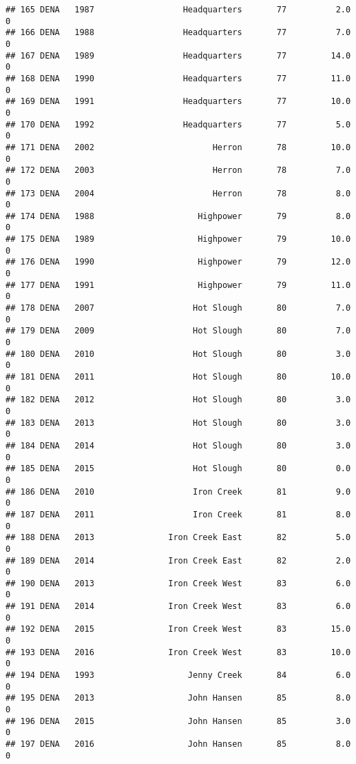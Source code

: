 \documentclass[
]{article}
\begin{document}
\begin{verbatim}
## 165 DENA   1987                  Headquarters       77          2.0       0
## 166 DENA   1988                  Headquarters       77          7.0       0
## 167 DENA   1989                  Headquarters       77         14.0       0
## 168 DENA   1990                  Headquarters       77         11.0       0
## 169 DENA   1991                  Headquarters       77         10.0       0
## 170 DENA   1992                  Headquarters       77          5.0       0
## 171 DENA   2002                        Herron       78         10.0       0
## 172 DENA   2003                        Herron       78          7.0       0
## 173 DENA   2004                        Herron       78          8.0       0
## 174 DENA   1988                     Highpower       79          8.0       0
## 175 DENA   1989                     Highpower       79         10.0       0
## 176 DENA   1990                     Highpower       79         12.0       0
## 177 DENA   1991                     Highpower       79         11.0       0
## 178 DENA   2007                    Hot Slough       80          7.0       0
## 179 DENA   2009                    Hot Slough       80          7.0       0
## 180 DENA   2010                    Hot Slough       80          3.0       0
## 181 DENA   2011                    Hot Slough       80         10.0       0
## 182 DENA   2012                    Hot Slough       80          3.0       0
## 183 DENA   2013                    Hot Slough       80          3.0       0
## 184 DENA   2014                    Hot Slough       80          3.0       0
## 185 DENA   2015                    Hot Slough       80          0.0       0
## 186 DENA   2010                    Iron Creek       81          9.0       0
## 187 DENA   2011                    Iron Creek       81          8.0       0
## 188 DENA   2013               Iron Creek East       82          5.0       0
## 189 DENA   2014               Iron Creek East       82          2.0       0
## 190 DENA   2013               Iron Creek West       83          6.0       0
## 191 DENA   2014               Iron Creek West       83          6.0       0
## 192 DENA   2015               Iron Creek West       83         15.0       0
## 193 DENA   2016               Iron Creek West       83         10.0       0
## 194 DENA   1993                   Jenny Creek       84          6.0       0
## 195 DENA   2013                   John Hansen       85          8.0       0
## 196 DENA   2015                   John Hansen       85          3.0       0
## 197 DENA   2016                   John Hansen       85          8.0       0

\end{verbatim}
\end{document}
